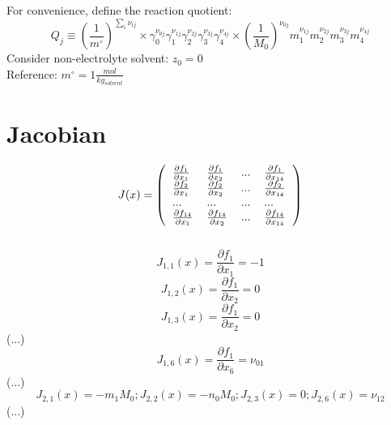 \documentclass[onecolumn]{article}
\begin{document}
For convenience, define the reaction quotient:\\
\begin{equation}
\label{eq:reaction_quotient}
Q_j \equiv \left(\frac{1}{m^{\circ}}\right)^{\sum_i{\nu_{ij}}}\times
\gamma_0^{\nu_{0j}}\gamma_1^{\nu_{1j}}\gamma_2^{\nu_{2j}}
\gamma_3^{\nu_{3j}}\gamma_4^{\nu_{4j}}\times
\left(\frac{1}{M_0}\right)^{\nu_{0j}}m_1^{\nu_{1j}}m_2^{\nu_{2j}}
m_3^{\nu_{3j}}m_4^{\nu_{4j}}
\end{equation}
Consider non-electrolyte solvent: $z_0 = 0$ \\
Reference: $m^{\circ} = 1\frac{mol}{kg_{solvent}}$
\section{Jacobian}
\[
J(x) = \left(
\begin{tabular}{llll}
$\frac{\partial{f_1}}{\partial{x_1}}$ &
$\frac{\partial{f_1}}{\partial{x_2}}$ & ... &
$\frac{\partial{f_1}}{\partial{x_{14}}}$\\
$\frac{\partial{f_2}}{\partial{x_1}}$ &
$\frac{\partial{f_2}}{\partial{x_2}}$ & ... &
$\frac{\partial{f_2}}{\partial{x_{14}}}$\\
$...$ & $...$ & $...$ & $...$\\
$\frac{\partial{f_{14}}}{\partial{x_1}}$ &
$\frac{\partial{f_{14}}}{\partial{x_2}}$ & ... &
$\frac{\partial{f_{14}}}{\partial{x_{14}}}$\\
\end{tabular}
\right)
\]\\
\[
J_{1,1}(x) = \frac{\partial{f_{1}}}{\partial{x_1}} =  -1
\]
\[
J_{1,2}(x) = \frac{\partial{f_{1}}}{\partial{x_2}} =  0
\]
\[
J_{1,3}(x) = \frac{\partial{f_{1}}}{\partial{x_2}} =  0
\]
(...)
\[
J_{1,6}(x) = \frac{\partial{f_{1}}}{\partial{x_6}} =  \nu_{01}
\]
(...)
\[
J_{2,1}(x) =  -m_1 M_0;
J_{2,2}(x) =  -n_0 M_0;
J_{2,3}(x) =  0;
J_{2,6}(x) = \nu_{12}
\]
(...)
\end{document}
